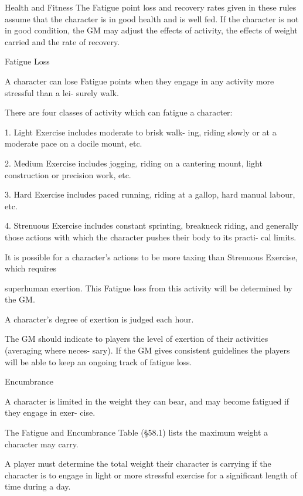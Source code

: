 \begin{Chapter}{Health and Fitness}
The  Fatigue point loss and recovery  rates given in 
these  rules  assume  that  the  character  is  in  good 
health  and  is  well  fed.  If  the  character  is  not  in 
good  condition,  the  GM  may  adjust  the  effects  of 
activity,  the  effects  of  weight  carried  and  the  rate 
of recovery. 

Fatigue Loss 

A  character  can  lose  Fatigue  points  when  they 
engage  in  any  activity  more  stressful  than  a  lei-
surely walk. 

There are four classes of activity which can fatigue 
a character: 

1. Light Exercise includes moderate to brisk walk-
ing, riding slowly or at a moderate pace on a docile 
mount, etc. 

2.  Medium  Exercise  includes  jogging,  riding  on  a 
cantering  mount,  light  construction  or  precision 
work, etc. 

3. Hard Exercise includes paced running, riding at 
a gallop, hard manual labour, etc. 

4.  Strenuous  Exercise  includes  constant  sprinting, 
breakneck  riding,  and  generally  those  actions  with 
which the character pushes their body to its practi-
cal limits. 

It  is  possible  for  a  character’s  actions  to  be  more 
taxing  than  Strenuous  Exercise,  which  requires 

superhuman  exertion.  This  Fatigue  loss  from  this 
activity will be determined by the GM. 

A  character’s  degree  of  exertion  is  judged  each 
hour. 

The  GM  should  indicate  to  players  the  level  of 
exertion of their activities (averaging where neces-
sary).  If  the  GM  gives  consistent  guidelines  the 
players  will  be  able  to  keep  an  ongoing  track  of 
fatigue loss. 

Encumbrance 

A character is limited in the weight they can bear, 
and  may  become  fatigued  if  they  engage  in  exer-
cise. 

The  Fatigue  and  Encumbrance  Table  (§58.1)  lists 
the maximum weight a character may carry. 

A  player  must  determine  the  total  weight  their 
character is carrying if the character is to engage in 
light  or  more  stressful  exercise  for  a  significant 
length of time during a day. 


\end{Chapter}
